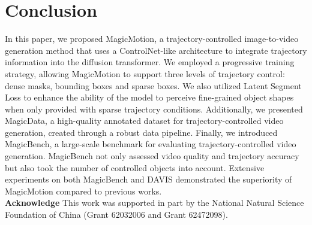 \section{Conclusion}
In this paper, we proposed MagicMotion, a trajectory-controlled image-to-video generation method that uses a ControlNet-like architecture to integrate trajectory information into the diffusion transformer. We employed a progressive training strategy, allowing MagicMotion to support three levels of trajectory control: dense masks, bounding boxes and sparse boxes. We also utilized Latent Segment Loss to enhance the ability of the model to perceive fine-grained object shapes when only provided with sparse trajectory conditions.
Additionally, we presented MagicData, a high-quality annotated dataset for trajectory-controlled video generation, created through a robust data pipeline.
Finally, we introduced MagicBench, a large-scale benchmark for evaluating trajectory-controlled video generation. MagicBench not only assessed video quality and trajectory accuracy but also took the number of controlled objects into account.
Extensive experiments on both MagicBench and DAVIS demonstrated the superiority of MagicMotion compared to previous works.
\\
\textbf{Acknowledge} This work was supported in part by the National Natural Science Foundation of China (Grant 62032006 and Grant 62472098).